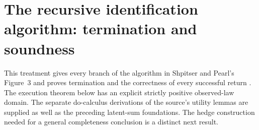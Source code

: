 \section{The recursive identification algorithm: termination and soundness}
\label{sec:p16-identification-algorithm}

This treatment gives every branch of the algorithm in Shpitser and
Pearl's Figure~3 and proves termination and the correctness of every
successful return \cite[Figure~3, Lemmas~3--8 and Theorem~5,
pp.~1223--1225]{ShpitserPearl2006JointIdentification}.
The execution theorem below has an explicit strictly positive observed-law
domain. The separate do-calculus derivations of the source's utility
lemmas are supplied as well as the preceding latent-sum foundations.
The hedge construction needed for a general completeness conclusion is
a distinct next result.

